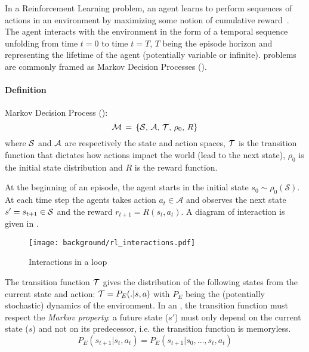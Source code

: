 In a Reinforcement Learning problem, an agent learns to perform sequences of actions in an environment by maximizing some notion of cumulative reward~\citep{sutton2018reinforcement}.  The agent interacts with the environment in the form of a temporal sequence unfolding from time $t=0$ to time $t=T$, $T$ being the episode horizon and representing the lifetime of the agent (potentially variable or infinite). \rl problems are commonly framed as Markov Decision Processes (\mdps).
\begin{tcolorbox}
\small
\paragraph{Definition}
\gls{Markov Decision Process} (\mdp):
\begin{equation}
	\mathcal{M}\,=\,\{\mathcal{S},\,\mathcal{A},\,\mathcal{T},\,\rho_0,\,R\}
	\label{eq:standard_mdp}	
\end{equation}
where $\mathcal{S}$ and $\mathcal{A}$ are respectively the state and action spaces, $\mathcal{T}$ is the transition function that dictates how actions impact the world (lead to the next state), $\rho_0$ is the initial state distribution and $R$ is the reward function. 
\end{tcolorbox}
At the beginning of an episode, the agent starts in the initial state $s_0 \sim \rho_0(\mathcal{S})$. At each time step the agents takes action $a_t \in \mathcal{A}$ and observes the next state $s'=s_{t+1} \in \mathcal{S}$ and the reward $r_{t+1}=R(s_t,a_t)$. A diagram of interaction is given in .
\begin{figure}[!h]
\centering
\texttt{[image: background/rl\_interactions.pdf]}	
\caption{Interactions in a \rl loop}
\label{fig:rl_interacvtions}
\end{figure}
The transition function $\mathcal{T}$ gives the distribution of the following states from the current state and action: $\mathcal{T}=P_E(.|s, a)$ with $P_E$ being the (potentially stochastic) dynamics of the environment. In an \mdp, the transition function must respect the \textit{Markov property}: a future state ($s'$) must only depend on the current state ($s$) and not on its predecessor, i.e. the transition function is memoryless. 
\begin{equation}
 P_E(s_{t+1}|s_t,a_t) = P_E(s_{t+1}|s_0,\dots,s_t,a_t)	
\end{equation}

